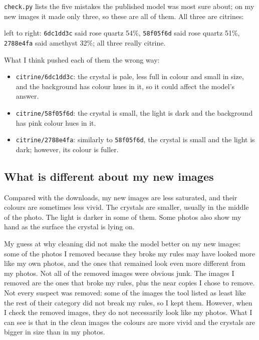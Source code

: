 \documentclass[11pt]{article}
\begin{document}
\texttt{check.py} lists the five mistakes the published model was most sure
about; on my new images it made only three, so these are all of them. All three
are citrines:

\hfill
{}\hfill
{}

{\small left to right: \texttt{6dc1dd3c} said rose quartz 54\%,
\texttt{58f05f6d} said rose quartz 51\%, \texttt{2788e4fa} said amethyst 32\%;
all three really citrine.}

What I think pushed each of them the wrong way:

\begin{itemize}
\item \texttt{citrine/6dc1dd3c}: the crystal is pale, less full in colour and
small in size, and the background has colour hues in it, so it could affect the
model's answer.
\item \texttt{citrine/58f05f6d}: the crystal is small, the light is dark and the
background has pink colour hues in it.
\item \texttt{citrine/2788e4fa}: similarly to \texttt{58f05f6d}, the crystal is
small and the light is dark; however, its colour is fuller.
\end{itemize}

\subsection*{What is different about my new images}

Compared with the downloads, my new images are less saturated, and their
colours are sometimes less vivid. The crystals are smaller, usually in the
middle of the photo. The light is darker in some of them. Some photos also show
my hand as the surface the crystal is lying on.

My guess at why cleaning did not make the model better on my new images: some
of the photos I removed because they broke my rules may have looked more like
my own photos, and the ones that remained look even more different from my
photos. Not all of the removed images were obvious junk. The images I removed are the
ones that broke my rules, plus the near copies I chose to remove. Not every
suspect was removed: some of the images the tool listed as least like the rest
of their category did not break my rules, so I kept them. However, when I check the removed images, they do not necessarily look like my
photos. What I can see is that in the clean images the colours are more vivid
and the crystals are bigger in size than in my photos.
\end{document}
